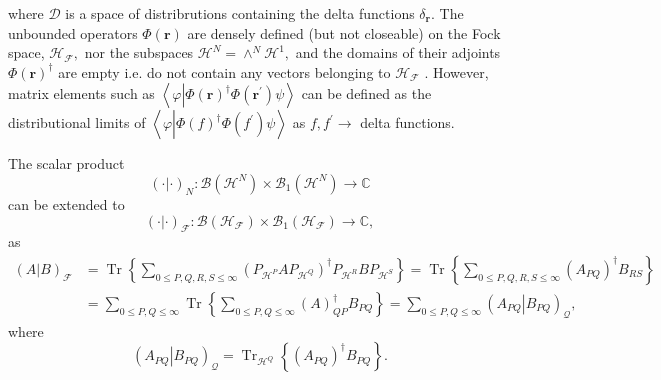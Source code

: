 \documentclass[aps,preprint]{revtex4}%
\begin{document}
where $\mathcal{D}$ is a space of distribrutions containing the delta
functions $\delta_{\mathbf{r}}.$ The unbounded operators $\Phi\left(
\boldsymbol{r}\right)  $ are densely defined (but not closeable) on the Fock
space, $\mathcal{H}_{\mathcal{F}},$ nor the subspaces $\mathcal{H}^{N}%
=\wedge^{N}\mathcal{H}^{1},$ and the domains of their adjoints $\Phi\left(
\boldsymbol{r}\right)  ^{\dagger}$ are empty i.e. do not contain any vectors
belonging to $\mathcal{H}_{\mathcal{F}}$ \cite{Thirring}. However, matrix
elements such as $\left\langle \varphi\left\vert \Phi\left(  \boldsymbol{r}%
\right)  ^{\dagger}\Phi\left(  \boldsymbol{r}^{\prime}\right)  \right.
\psi\right\rangle $ can be defined as the distributional limits of
$\left\langle \varphi\left\vert \Phi\left(  f\right)  ^{\dagger}\Phi\left(
f^{\prime}\right)  \right.  \psi\right\rangle $ as $f,f^{\prime}\rightarrow$
delta functions.

The scalar product%
\begin{equation}
\left(  \cdot\left\vert \cdot\right.  \right)  _{N}:\mathcal{B}\left(
\mathcal{H}^{N}\right)  \times\mathcal{B}_{1}\left(  \mathcal{H}^{N}\right)
\rightarrow\mathbb{C}%
\end{equation}
can be extended to
\begin{equation}
\left(  \cdot\left\vert \cdot\right.  \right)  _{\mathcal{F}}:\mathcal{B}%
\left(  \mathcal{H}_{\mathcal{F}}\right)  \times\mathcal{B}_{1}\left(
\mathcal{H}_{\mathcal{F}}\right)  \rightarrow\mathbb{C},
\end{equation}
as
\begin{align}
\left(  A\left\vert B\right.  \right)  _{\mathcal{F}}  &  =\operatorname*{Tr}%
\left\{  \sum_{0\leq P,Q,R,S\leq\infty}\left(  P_{\mathcal{H}^{P}%
}AP_{\mathcal{H}^{Q}}\right)  ^{\dagger}P_{\mathcal{H}^{R}}BP_{\mathcal{H}%
^{S}}\right\}  =\operatorname*{Tr}\left\{  \sum_{0\leq P,Q,R,S\leq\infty
}\left(  A_{PQ}\right)  ^{\dagger}B_{RS}\right\} \nonumber\\
&  =\sum_{0\leq P,Q\leq\infty}\operatorname*{Tr}\left\{  \sum_{0\leq
P,Q\leq\infty}\left(  A\right)  _{QP}^{\dagger}B_{PQ}\right\}  =\sum_{0\leq
P,Q\leq\infty}\left(  A_{PQ}\left\vert B_{PQ}\right.  \right)  _{\mathcal{Q}},
\end{align}
where
\begin{equation}
\left(  A_{PQ}\left\vert B_{PQ}\right.  \right)  _{\mathcal{Q}}%
=\operatorname*{Tr}\nolimits_{\mathcal{H}^{Q}}\left\{  \left(  A_{PQ}\right)
^{\dagger}B_{PQ}\right\}  .
\end{equation}
\end{document}
